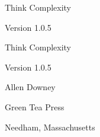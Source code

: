 \documentclass[10pt]{book}
\newcommand{\thetitle}{Think Complexity}
\newcommand{\theversion}{1.0.5}
\begin{document}
\begin{latexonly}

\renewcommand{\blankpage}{\thispagestyle{empty} \quad \newpage}



\thispagestyle{empty}

\begin{flushright}
\vspace*{2.0in}

\begin{spacing}{3}
{\huge \thetitle}
\end{spacing}

\vspace{0.25in}

Version \theversion

\vfill

\end{flushright}


\blankpage
\blankpage

\pagebreak
\thispagestyle{empty}

\begin{flushright}
\vspace*{2.0in}

\begin{spacing}{3}
{\huge \thetitle}
\end{spacing}

\vspace{0.25in}

Version \theversion

\vspace{1in}


{\Large
Allen Downey\\
}


\vspace{0.5in}

{\Large Green Tea Press}

{\small Needham, Massachusetts}

\vfill

\end{flushright}



\end{latexonly}
\end{document}
